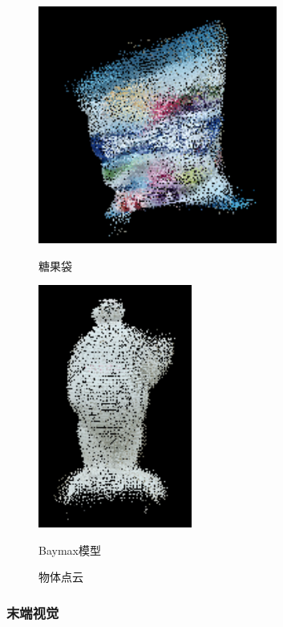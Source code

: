 \begin{figure}[H]
\begin{minipage}[t]{0.5\textwidth}
	\centering
    \includegraphics[width = 0.7\textwidth]{images/04alp.png}
    \caption{糖果袋}
    \label{fig:alp}
\end{minipage}
\begin{minipage}[t]{0.5\textwidth}
	\centering
    \includegraphics[width = 0.45\textwidth]{images/05baymax.png}
    \caption{Baymax模型}
    \label{fig:baymax}
\end{minipage}
\caption{物体点云}
\end{figure}

\subsubsection{末端视觉}

